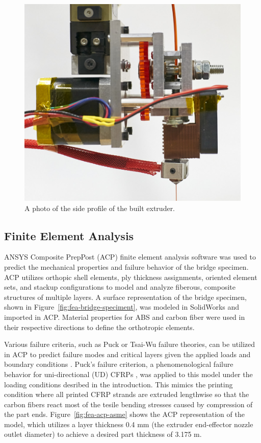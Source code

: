 \begin{figure}[htp]
\centering
\includegraphics[width=0.8\linewidth]{./figures/extruder-side-profile}
\caption{A photo of the side profile of the built extruder.}
\label{fig:extruder-side-profile}
\end{figure}


\subsection*{Finite Element Analysis}

ANSYS Composite PrepPost (ACP) finite element analysis software was used to predict the mechanical properties and failure behavior of the bridge specimen. ACP utilizes orthopic shell elements, ply thickness assignments, oriented element sets, and stackup configurations to model and analyze fiberous, composite structures of multiple layers. A surface representation of the bridge specimen, shown in Figure~\ref{fig:fea-bridge-speciment}, was modeled in SolidWorks and imported in ACP. Material properties for ABS and carbon fiber were used in their respective directions to define the orthotropic elements.

Various failure criteria, such as Puck or Tsai-Wu failure theories, can be utilized in ACP to predict failure modes and critical layers given the applied loads and boundary conditions \cite{ACP-manual}. Puck's failure criterion, a phenomenological failure behavior for uni-directional (UD) CFRPs \cite{Puck-Stuttgard,Puck-NASA}, was applied to this model under the loading conditions desribed in the introduction. This mimics the printing condition where all printed CFRP strands are extruded lengthwise so that the carbon fibers react most of the tesile bending stresses caused by compression of the part ends. Figure~\ref{fig:fea-acp-asme} shows the ACP representation of the model, which utilizes a layer thickness 0.4 mm (the extruder end-effector nozzle outlet diameter) to achieve a desired part thickness of 3.175 m.

